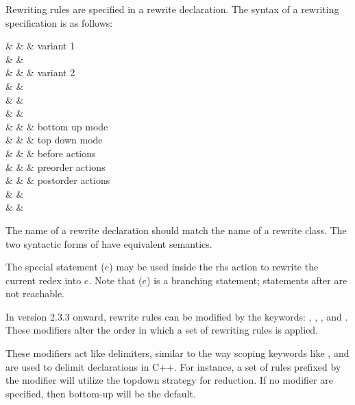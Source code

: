 
Rewriting rules are specified in a rewrite declaration.
The syntax of a rewriting specification is as follows:

\begin{syntax}
   & \IS &  \Id & variant 1 \\
   &    & \T{\{}  
         \T{\}} \\
   & \OR &  \Id & variant 2 \\
   &    & \T{\{}   \T{\}} \\
  & \IS &   \\
  & & \quad \Pat {}  \T{:}  \\
  & \IS &  & bottom up mode \\
  & \OR &  & top down mode \\
  & \OR &  & before actions \\
  & \OR &  & preorder actions \\
  & \OR &  & postorder actions \\
 & \IS & \T{\{}  \T{\}} \\
                  & \OR & \Exp \\
\end{syntax}

The name of a rewrite declaration should match the name of
a rewrite class.  
The two syntactic forms of  have equivalent semantics.

The special statement ($e$) may be used
inside the rhs action to rewrite the current redex into $e$.
Note that ($e$) is a branching statement; statements
after  are not reachable.

In version 2.3.3 onward, rewrite rules can be modified by the 
keywords: , , , 
and .   These modifiers 
alter the order in which a set of rewriting rules is applied. 

These modifiers act like delimiters, similar
to the way scoping keywords like ,  and 
 are used to delimit declarations in C++.
For instance, a set of rules prefixed by the modifier 
will utilize the topdown strategy for reduction.  If no modifier are
specified, then bottom-up will be the default.

